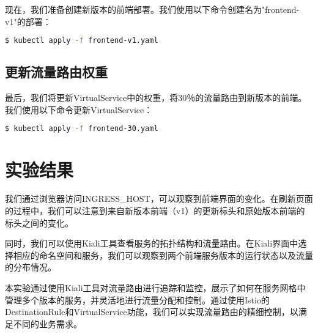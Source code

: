 现在，我们准备创建新版本的前端部署。我们使用以下命令创建名为"frontend-v1"的部署：

\begin{lstlisting}[language=bash]
	$ kubectl apply -f frontend-v1.yaml
\end{lstlisting}

\subsection{更新流量路由权重}

最后，我们将更新VirtualService中的权重，将30％的流量路由到新版本的前端。我们使用以下命令更新VirtualService：

\begin{lstlisting}[language=bash]
	$ kubectl apply -f frontend-30.yaml
\end{lstlisting}
\section{实验结果}
我们通过浏览器访问INGRESS\_HOST，可以观察到前端界面的变化。在刷新页面的过程中，我们可以注意到来自新版本前端（v1）的更新标头和原始版本前端的标头之间的变化。

同时，我们可以使用Kiali工具查看服务的拓扑结构和流量路由。在Kiali界面中选择相应的命名空间和服务，我们可以观察到两个前端服务版本的运行状态以及流量的分布情况。

本实验通过使用Kiali工具对流量路由进行追踪和监控，展示了如何在服务网格中管理多个版本的服务，并灵活地进行流量分配和控制。通过使用Istio的DestinationRule和VirtualService功能，我们可以实现流量路由的精细控制，以满足不同的业务需求。
